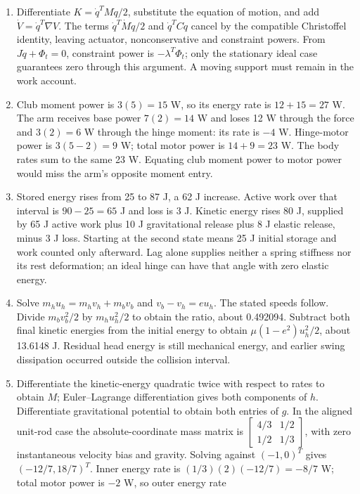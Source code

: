 \begin{enumerate}
\item Differentiate $K=\dot q^TM\dot q/2$, substitute the equation of motion,
and add $\dot V=\dot q^T\nabla V$. The terms
$\dot q^T\dot M\dot q/2$ and $\dot q^TC\dot q$ cancel by the compatible
Christoffel identity, leaving actuator, nonconservative and constraint powers.
From $J\dot q+\Phi_t=0$, constraint power is $-\lambda^T\Phi_t$; only the
stationary ideal case guarantees zero through this argument. A moving support
must remain in the work account.
\item Club moment power is $3(5)=15$ W, so its energy rate is $12+15=27$ W.
The arm receives base power $7(2)=14$ W and loses 12 W through the force and
$3(2)=6$ W through the hinge moment: its rate is $-4$ W. Hinge-motor power is
$3(5-2)=9$ W; total motor power is $14+9=23$ W. The body rates sum to the
same 23 W. Equating club moment power to motor power would miss the arm's
opposite moment entry.
\item Stored energy rises from 25 to 87 J, a 62 J increase. Active work over
that interval is $90-25=65$ J and loss is 3 J. Kinetic energy rises 80 J,
supplied by 65 J active work plus 10 J gravitational release plus 8 J elastic
release, minus 3 J loss. Starting at the second state means 25 J initial
storage and work counted only afterward. Lag alone supplies neither a spring
stiffness nor its rest deformation; an ideal hinge can have that angle with
zero elastic energy.
\item Solve $m_hu_h=m_hv_h+m_bv_b$ and $v_b-v_h=e u_h$. The stated speeds
follow. Divide $m_bv_b^2/2$ by $m_hu_h^2/2$ to obtain the ratio, about
0.492094. Subtract both final kinetic energies from the initial energy to obtain
$\mu(1-e^2)u_h^2/2$, about 13.6148 J. Residual head energy is still mechanical
energy, and earlier swing dissipation occurred outside the collision interval.
\item Differentiate the kinetic-energy quadratic twice with respect to rates
to obtain $M$; Euler--Lagrange differentiation gives both components of $h$.
Differentiate gravitational potential to obtain both entries of $g$. In the
aligned unit-rod case the absolute-coordinate mass matrix is
$\left[\begin{smallmatrix}4/3&1/2\\1/2&1/3\end{smallmatrix}\right]$,
with zero instantaneous velocity bias and gravity. Solving against $(-1,0)^T$
gives $(-12/7,18/7)^T$. Inner energy rate is
$(1/3)(2)(-12/7)=-8/7$ W; total motor power is $-2$ W, so outer energy rate

\end{enumerate}
